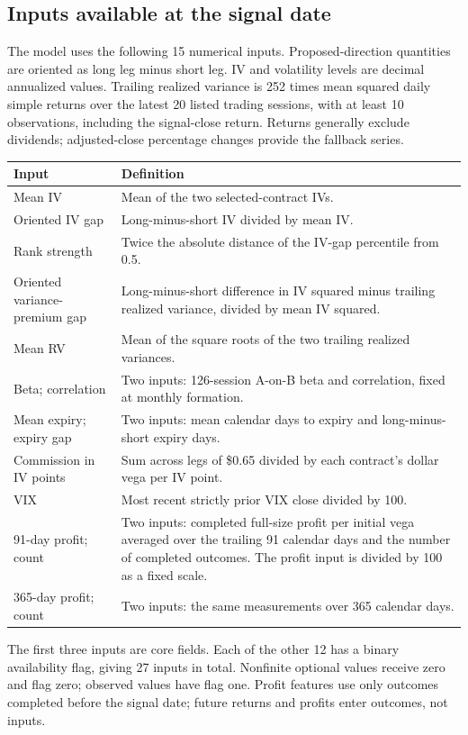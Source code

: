 \documentclass[11pt,letterpaper]{article}
\newcommand{\money}[1]{\$#1}
\begin{document}
\subsection{Inputs available at the signal date}
\label{app:features}
The model uses the following 15 numerical inputs. Proposed-direction quantities
are oriented as long leg minus short leg. IV and volatility levels are decimal
annualized values. Trailing realized variance is 252 times mean squared daily
simple returns over the latest 20 listed trading sessions, with at least 10
observations, including the signal-close return. Returns generally exclude dividends; adjusted-close percentage changes
provide the fallback series.

\begin{center}
\small
\begin{tabular}{p{}p{}}
\toprule
Input & Definition\\
\midrule
Mean IV & Mean of the two selected-contract IVs.\\
Oriented IV gap & Long-minus-short IV divided by mean IV.\\
Rank strength & Twice the absolute distance of the IV-gap percentile from 0.5.\\
Oriented variance-premium gap & Long-minus-short difference in IV squared minus trailing realized variance, divided by mean IV squared.\\
Mean RV & Mean of the square roots of the two trailing realized variances.\\
Beta; correlation & Two inputs: 126-session A-on-B beta and correlation, fixed at monthly formation.\\
Mean expiry; expiry gap & Two inputs: mean calendar days to expiry and long-minus-short expiry days.\\
Commission in IV points & Sum across legs of \money{0.65} divided by each contract's dollar vega per IV point.\\
VIX & Most recent strictly prior VIX close divided by 100.\\
91-day profit; count & Two inputs: completed full-size profit per initial vega averaged over the trailing 91 calendar days and the number of completed outcomes. The profit input is divided by 100 as a fixed scale.\\
365-day profit; count & Two inputs: the same measurements over 365 calendar days.\\
\bottomrule
\end{tabular}
\end{center}
The first three inputs are core fields. Each of the other 12 has a binary
availability flag, giving 27 inputs in total. Nonfinite optional values receive
zero and flag zero; observed values have flag one. Profit features use only outcomes completed before the signal date;
future returns and profits enter outcomes, not inputs.
\end{document}
